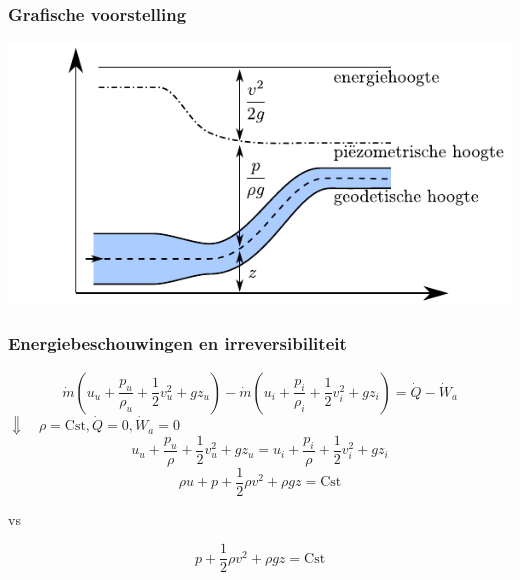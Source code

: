 \documentclass[t]{beamer}
\begin{document}
	\begin{frame}
		\frametitle{Grafische voorstelling}
		\vspace{1cm}
		\center
		\includegraphics{fig/deeltjesvergelijkingen/Energiehoogte}
	\end{frame}
	\begin{frame}
		\frametitle{Energiebeschouwingen en irreversibiliteit}
		\begin{equation*}
			\dot{m} (u_u + \frac{p_u}{\rho_u} + \frac{1}{2}v^2_u + g z_u) - \dot{m} (u_i + \frac{p_i}{\rho_i}+ \frac{1}{2}v^2_i + g z_i) = \dot{Q}-\dot{W}_a
		\end{equation*}
		\pause
			\hspace{5cm} $\Downarrow \quad \rho = \textrm{Cst}, \dot{Q} = 0, \dot{W}_a = 0$ 
		\begin{equation*}
			u_u + \frac{p_u}{\rho} + \frac{1}{2}v^2_u + g z_u = u_i + \frac{p_i}{\rho}+ \frac{1}{2}v^2_i + g z_i
		\end{equation*}
		\pause
		\begin{equation*}
			\rho u + p + \frac{1}{2} \rho v^2 + \rho g z = \textrm{Cst}
		\end{equation*}
		\pause
		\begin{center}
			vs
		\end{center}
		\begin{equation*}
			p + \frac{1}{2} \rho v^2 + \rho g z = \textrm{Cst}
		\end{equation*}
	\end{frame}
\end{document}
